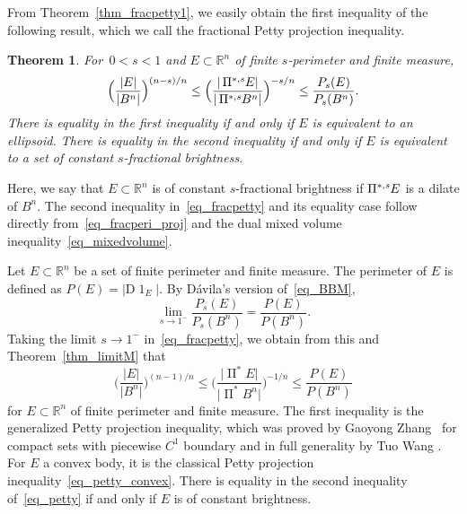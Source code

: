 \documentclass{amsart}
\newtheorem{theorem}{Theorem}
\newcommand{\opp}{\operatorname{\Pi}^*\!}
\newcommand{\ofpp}[1]{\operatorname{\Pi^{\ast,{\it #1}}}\!}
\newcommand{\Bvtex}{{B^n}}
\newcommand{\Dvtex}{\mathrm{D}}
\newcommand{\vol}[1]{ \vert #1\vert}
\renewcommand{\chi}{\operatorname{1}}
\begin{document}
From Theorem~\ref{thm_fracpetty1}, we easily obtain the first inequality
of the following result, which we call the fractional Petty projection
inequality.
%
\begin{theorem}%
\label{thm_fracpetty}
For $\,0<s<1$ and $E\subset \mathbb R^{n}$ of finite $s$-perimeter and
finite measure,
%
\begin{equation}
\label{eq_fracpetty}
\Big(\frac{\vol{ E}}{\vol{\Bvtex}}\Big)^{ {(n-s)}/n} \le \Big(
\frac{\vol{\ofpp{s} E}}{\vol{\ofpp{s} \Bvtex}}\Big)^{- s/ n}
\le \frac{ P_{s}(E)}{P_{s}(\Bvtex )}.
\end{equation}
%
There is equality in the first inequality if and only if $E$ is equivalent
to an ellipsoid. There is equality in the second inequality if and only
if $E$ is equivalent to a set of constant $s$-fractional brightness.
\end{theorem}

\noindent
Here, we say that $E\subset \mathbb R^{n}$ is of constant $s$-fractional
brightness if $\ofpp{s} E$ is a dilate of $\Bvtex $. The second inequality
in~\eqref{eq_fracpetty} and its equality case follow directly from~\eqref{eq_fracperi_proj} and the dual mixed volume inequality~\eqref{eq_mixedvolume}.

Let $E\subset \mathbb R^{n}$ be a set of finite perimeter and finite measure.
The perimeter of $E$ is defined as $P(E)= \vert \Dvtex \chi _{E}\vert $. By
D\'avila's version of~\eqref{eq_BBM},
%
\begin{equation*}
\lim _{s\to 1^{-}} \frac{P_{s}(E)}{P_{s}(\Bvtex )} = \frac{P(E)}{P(\Bvtex )}.
\end{equation*}
%
Taking the limit $s\to 1^{-}$ in~\eqref{eq_fracpetty}, we obtain from this
and Theorem~\ref{thm_limitM} that
%
\begin{equation}
\label{eq_petty}
\Big(\frac{\vol{ E}}{\vol{\Bvtex}}\Big)^{ {(n-1)}/n} \le \Big(
\frac{\vol{\opp E}}{\vol{\opp \Bvtex}}\Big)^{- 1/ n}
\le \frac{ P(E)}{P(\Bvtex )}
\end{equation}
%
for $E\subset \mathbb R^{n}$ of finite perimeter and finite measure. The
first inequality is the generalized Petty projection inequality, which
was proved by Gaoyong Zhang~\cite{Zhang99} for compact sets with piecewise
$C^{1}$ boundary and in full generality by Tuo Wang \cite{Tuo_Wang}. For
$E$ a convex body, it is the classical Petty projection inequality~\eqref{eq_petty_convex}. There is equality in the second inequality of~\eqref{eq_petty} if and only if $E$ is of constant brightness.
\end{document}
